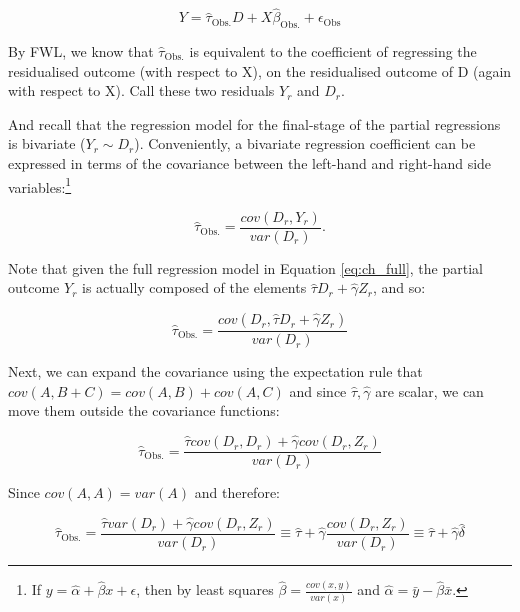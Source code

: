 \documentclass[
]{book}
\begin{document}
\begin{equation}
Y = \hat{\tau}_\text{Obs.}D + X\hat{\beta}_\text{Obs.} + \epsilon_\text{Obs}
\end{equation}

By FWL, we know that \(\hat{\tau}_\text{Obs.}\) is equivalent to the coefficient of regressing the residualised outcome (with respect to X), on the residualised outcome of D (again with respect to X). Call these two residuals \(Y_r\) and \(D_r\).

And recall that the regression model for the final-stage of the partial regressions is bivariate (\(Y_r \sim D_r\)). Conveniently, a bivariate regression coefficient can be expressed in terms of the covariance between the left-hand and right-hand side variables:\footnote{If $y = \hat{\alpha} + \hat{\beta}x + \epsilon$, then by least squares $\hat{\beta} = \frac{cov(x,y)}{var(x)}$ and $\hat{\alpha} = \bar{y} - \hat{\beta}\bar{x}$.}

\begin{equation}
    \hat{\tau}_\text{Obs.} = \frac{cov(D_r, Y_r)}{var(D_r)}.
\end{equation}

Note that given the full regression model in Equation \ref{eq:ch_full}, the partial outcome \(Y_r\) is actually composed of the elements \(\hat{\tau}D_r + \hat{\gamma}Z_r\), and so:

\begin{equation}
    \hat{\tau}_\text{Obs.} = \frac{cov(D_r, \hat{\tau}D_r + \hat{\gamma}Z_r)}{var(D_r)} \label{eq:cov_expand}
\end{equation}

Next, we can expand the covariance using the expectation rule that \(cov(A, B+C) = cov(A,B) + cov(A,C)\) and since \(\hat{\tau},\hat{\gamma}\) are scalar, we can move them outside the covariance functions:

\begin{equation}
    \hat{\tau}_\text{Obs.} = \frac{\hat{\tau}cov(D_r, D_r) + \hat{\gamma}cov(D_r,Z_r)}{var(D_r)}
\end{equation}

Since \(cov(A,A) = var(A)\) and therefore:

\begin{equation}
    \hat{\tau}_\text{Obs.} = \frac{\hat{\tau}var(D_r) + \hat{\gamma}cov(D_r,Z_r)}{var(D_r)} \equiv \hat{\tau} + \hat{\gamma}\frac{cov(D_r,Z_r)}{var(D_r)} \equiv \hat{\tau} + \hat{\gamma}\hat{\delta}
\end{equation}
\end{document}
